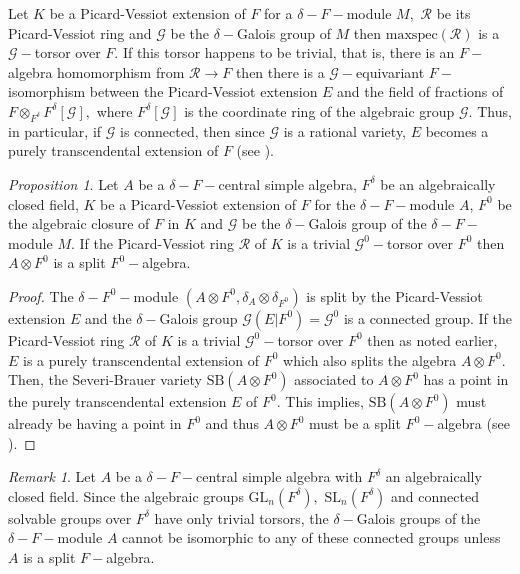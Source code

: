 \documentclass[preprint, 11pt]{amsart}
\theoremstyle{corollary}
\theoremstyle{remark}
\newtheorem{remark}[theorem]{Remark}
\theoremstyle{proposition}
\newtheorem{proposition}[theorem]{Proposition}
\numberwithin{equation}{subsection}
\begin{document}
Let $K$ be a Picard-Vessiot extension of $F$ for  a  $\delta-F-$module $M,$ $\mathscr R$ be its Picard-Vessiot ring and $\mathscr G$ be the $\delta-$Galois group of $M$ then $\mathrm{maxspec}(\mathscr R)$  is a $\mathscr G-$torsor over $F.$  If this torsor happens to be trivial, that is, there is an $F-$algebra homomorphism from $\mathscr R\to F$ then there is a $\mathscr G-$equivariant $F-$isomorphism between the Picard-Vessiot extension $E$ and the field of fractions of $F\otimes_{F^{\delta}} F^{\delta}[\mathscr G],$ where $F^{\delta}[\mathscr G]$ is the coordinate ring of the algebraic group $\mathscr{G}.$  Thus, in particular, if $\mathscr G$ is connected, then since $\mathscr G$ is a rational variety, $E$ becomes a purely transcendental extension of $F$ (see \cite[Theorem 5.19]{Mag-94}).

\begin{proposition}\label{criteria-torsor}
	Let $A$ be a $\delta-F-$central simple algebra, $F^{\delta}$ be an algebraically closed field, $K$ be a Picard-Vessiot extension of $F$ for the $\delta-F-$module $A$, $F^0$ be the algebraic closure of $F$ in $K$ and $\mathscr G$ be the $\delta-$Galois group of the $\delta-F-$module $M.$ If the Picard-Vessiot ring $\mathscr R$ of $K$ is a trivial $\mathscr G^0-$torsor over $F^0$ then $A\otimes F^0$ is a split $F^0-$algebra.
\end{proposition}

\begin{proof}
	The $\delta-F^0-$module $(A\otimes F^0, \delta_A\otimes \delta_{F^0})$ is split by the Picard-Vessiot extension $E$ and the $\delta-$Galois group $\mathscr{G}(E|F^0)=\mathscr G^0$ is a connected group. If the Picard-Vessiot ring  $\mathscr R$ of $K$ is a trivial $\mathscr G^0-$torsor over $F^0$ then as noted earlier, $E$ is a purely transcendental extension of $F^0$ which also splits the algebra $A\otimes F^0.$ Then, the Severi-Brauer variety $\mathrm{SB}(A\otimes F^0)$ associated to $A\otimes F^0$ has  a point in the purely transcendental extension $E$ of $F^0.$ This implies, $\mathrm{SB}(A\otimes F^0)$ must already be having a point in $F^0$ and thus $A\otimes F^0$ must be a split $F^0-$algebra (see \cite[Theorems 3.8.6, 3.8.7]{Jac-96}).
\end{proof}

\begin{remark}
Let $A$ be a $\delta-F-$central simple algebra with $F^{\delta}$ an algebraically closed field. Since the algebraic groups $\mathrm{GL}_n(F^{\delta}),$ $\mathrm{SL}_n(F^{\delta})$ and  connected solvable groups over $F^{\delta}$ have only trivial torsors, the $\delta-$Galois groups of the $\delta-F-$module $A$ cannot be isomorphic to any of these connected groups unless $A$ is a split $F-$algebra.
\end{remark}



	
\end{document}
